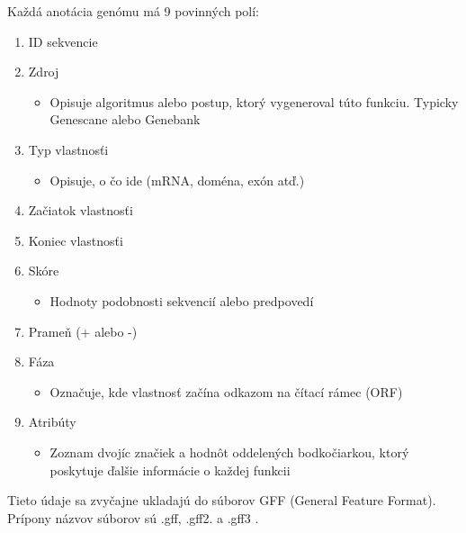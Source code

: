 Každá anotácia genómu má 9 povinných polí:
\begin{enumerate}
    \item ID sekvencie
    \item Zdroj
    \begin{itemize}
        \item Opisuje algoritmus alebo postup, ktorý vygeneroval túto funkciu. Typicky Genescane alebo Genebank
    \end{itemize}
    \item Typ vlastnosťi
    \begin{itemize}
        \item Opisuje, o čo ide (mRNA, doména, exón atď.)
    \end{itemize}
    \item Začiatok vlastnosťi
    \item Koniec vlastnosťi
    \item Skóre 
    \begin{itemize}
        \item Hodnoty podobnosti sekvencií alebo predpovedí
    \end{itemize}
    \item Prameň (+ alebo -)
    \item Fáza
    \begin{itemize}
        \item Označuje, kde vlastnosť začína odkazom na čítací rámec (ORF)
    \end{itemize}
    \item Atribúty
    \begin{itemize}
        \item Zoznam dvojíc značiek a hodnôt oddelených bodkočiarkou, ktorý poskytuje ďalšie informácie o každej funkcii
    \end{itemize}
\end{enumerate}
Tieto údaje sa zvyčajne ukladajú do súborov GFF (General Feature Format). Prípony názvov súborov sú .gff, .gff2. a .gff3 \cite{gff2}.

